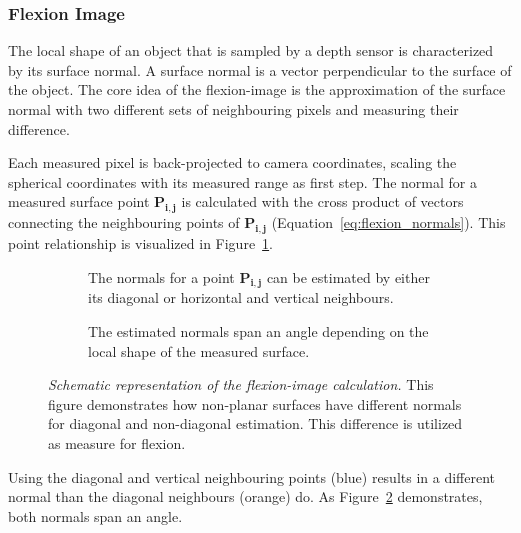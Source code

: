\subsubsection{Flexion Image}\label{flexion-image-section}

The local shape of an object that is sampled by a depth sensor is characterized by its surface normal.
A surface normal is a vector perpendicular to the surface of the object.
The core idea of the \Gls{flexion-image} is the approximation of the surface normal with two different sets of neighbouring pixels and measuring their difference.

Each measured pixel is back-projected to camera coordinates, scaling the spherical coordinates with its measured range as first step.
The normal for a measured surface point $\mathbf{P_{i,j}}$ is calculated with the cross product of vectors connecting the neighbouring points of $\mathbf{P_{i,j}}$ (Equation~\ref{eq:flexion_normals}).
This point relationship is visualized in Figure~\ref{fig:flexion_normals_plane}.
\begin{figure}[ht]
    \begin{subfigure}[t]{0.48\linewidth}
        \centering
        \scalebox{1.0}{%
        
        }
        \caption{The normals for a point $\mathbf{P_{i,j}}$ can be estimated by either its diagonal or horizontal and vertical neighbours.}\label{fig:flexion_normals_plane}
    \end{subfigure}\quad
    \begin{subfigure}[t]{0.49\linewidth}
        \centering
        \scalebox{1.0}{%
        
        }
        \caption{The estimated normals span an angle depending on the local shape of the measured surface.}\label{fig:flexion_space}
    \end{subfigure}
    \caption[Schematic representation of the \gls{flexion-image} calculation]{\emph{Schematic representation of the \gls{flexion-image} calculation.} This figure demonstrates how non-planar surfaces have different normals for diagonal and non-diagonal estimation. This difference is utilized as measure for flexion.}%
    \label{fig:flexion-image-scetched}
\end{figure}
Using the diagonal and vertical neighbouring points (blue) results in a different normal than the diagonal neighbours (orange) do.
As Figure~\ref{fig:flexion_space} demonstrates, both normals span an angle.

